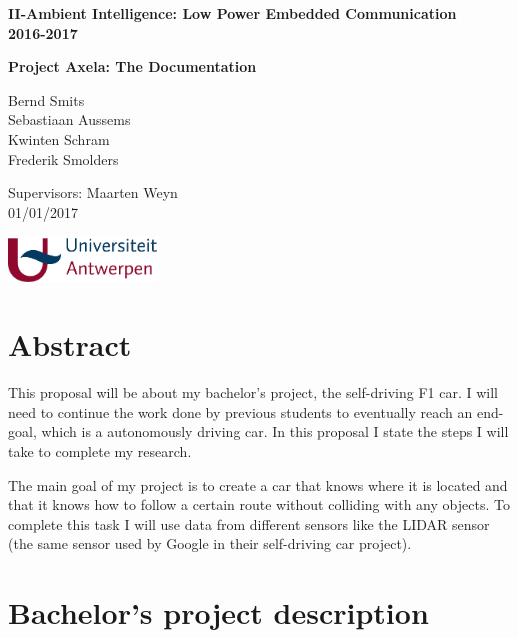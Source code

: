 \documentclass[a4paper,notitlepage]{article}
\begin{document}
\begin{titlepage}
    \centering
    \vfill
    {\bfseries\Large
        II-Ambient Intelligence: Low Power Embedded Communication\\2016-2017\\
        
    } 
    
    \hrulefill
    \vskip4cm
    
    {\bfseries\large
            Project Axela: The Documentation\\
            \vskip2cm
            
            Bernd Smits\\
            Sebastiaan Aussems\\
            Kwinten Schram\\
            Frederik Smolders\\
            \vskip2cm           
    }   
    {\bfseries   
            
            Supervisors: Maarten Weyn\\
           	01/01/2017   
            
            
            
            
    } 
    
    \vfill
    \includegraphics[width=4cm]{images/logo_UA_hor_kl_PMS.pdf}     
\end{titlepage}


\section*{Abstract}
This proposal will be about my bachelor's project, the self-driving F1 car. I will need to continue the work done by previous students to eventually reach an end-goal, which is a autonomously driving car. In this proposal I state the steps I will take to complete my research. 

The main goal of my project is to create a car that knows where it is located and that it knows how to follow a certain route without colliding with any objects. To complete this task I will use data from different sensors like the LIDAR sensor (the same sensor used by Google in their self-driving car project).

\tableofcontents
\vfill
\newpage


\section*{Bachelor's project description}
\end{document}
